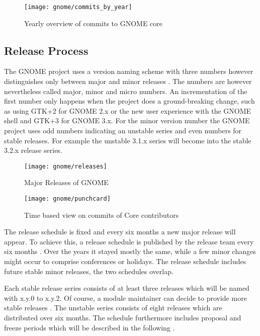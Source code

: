 \begin{figure}[htbp]
  \centering
  \texttt{[image: gnome/commits\_by\_year]}
  \caption{Yearly overview of commits to GNOME core}
\end{figure}


\subsection{Release Process} %

The GNOME project uses a version naming scheme with three numbers however
distinguishes only between major and minor releases
\cite{GNOMEDevelopmentSchedule,GNOMESchedule}. The numbers are however
nevertheless called major, minor and micro numbers. An incrementation of the
first number only happens when the project does a ground-breaking change, such
as using GTK+2 for GNOME 2.x or the new user experience with the GNOME shell
and GTK+3 for GNOME 3.x. For the minor version number the GNOME project uses
odd numbers indicating an unstable series and even numbers for stable releases.
For example the unstable 3.1.x series will become into the stable 3.2.x release
series.

\begin{figure}[htbp]
  \centering
  \texttt{[image: gnome/releases]}
  \caption{Major Releases of GNOME}
\end{figure}

\begin{figure}[htbp]
  \centering
  \texttt{[image: gnome/punchcard]}
  \caption{Time based view on commits of Core contributors}
\end{figure}

The release schedule is fixed and every six months a new major release will
appear. To achieve this, a release schedule is published by the release team
every six months \cite{GNOMEDevelopmentSchedule}. Over the years it stayed
mostly the same, while a few minor changes might occur to comprise conferences
or holidays. The release schedule includes future stable minor releases, the
two schedules overlap.

Each stable release series consists of at least three releases which will be
named with x.y.0 to x.y.2. Of course, a module maintainer can decide to provide
more stable releases \cite{GNOMEReleaseTeam}. The unstable series consists of
eight releases which are distributed over six months. The schedule furthermore
includes proposal and freeze periods which will be described in the following
\cite{GNOMEDevelopmentSchedule,GNOMESchedule}.

